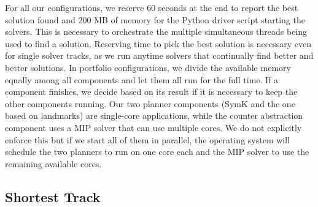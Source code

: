 \documentclass{article}
\renewcommand{\todo}[1]{} %
\begin{document}
For all our configurations, we reserve 60 seconds at the end to report the best solution found and 200 MB of memory for the Python driver script starting the solvers. This is necessary to orchestrate the multiple simultaneous threads being used to find a solution. Reserving time to pick the best solution is necessary even for single solver tracks, as we run anytime solvers that continually find better and better solutions. In portfolio configurations, we divide the available memory equally among all components and let them all run for the full time. If a component finishes, we decide based on its result if it is necessary to keep the other components running. Our two planner components (SymK and the one based on landmarks) are single-core applications, while the counter abstraction component uses a MIP solver that can use multiple cores. We do not explicitly enforce this but if we start all of them in parallel, the operating system will schedule the two planners to run on one core each and the MIP solver to use the remaining available cores.

\todo{\begin{itemize}
    \item For all our configurations, we reserve 60 seconds at the end to report
    the best solution found and 200 MB of memory for the Python driver script
    starting the solvers.
    \item Reserving time to pick the best solution is necessary even for single solver tracks, as we run anytime solvers that continually find better and better solutions.
    \item In portfolio configurations, we devide the available memory equally among all components and let them all run for the full time.
    \item If a component finishes, we decide based on its result if it is necessary to keep the other components running.
    \item Our two planner components (SymK and the one based on landmarks) are single-core applications, while the counter abstraction component uses a MIP solver that can use multiple cores.
    We do not explicitly enforce this but if we start all of them in parallel, the operating system will schedule the two planners to run on one core each and the MIP solver to use the remaining available cores.
\end{itemize}}

\subsection{Shortest Track}
\end{document}
